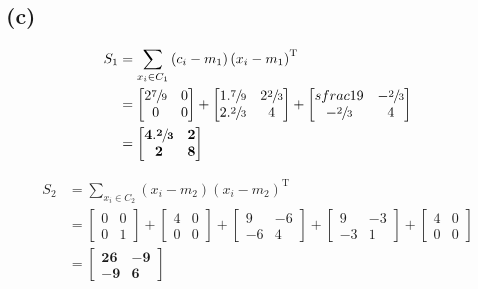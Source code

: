 \documentclass[12pt]{article}
\begin{document}
	\subsection*{(c)}
	\begingroup
	\addtolength{\jot}{1em}
	\begin{align*}
		S_1 &= \sum_{x_i \in C_1} \left(c_i-m_1\right)\left(x_i-m_1\right)^\textrm{T} \\
		&= \begin{bmatrix}
			2\sfrac{7}{9} & 0 \\
			0 & 0
		\end{bmatrix}
		+ \begin{bmatrix}
			1.\sfrac{7}{9} & 2\sfrac{2}{3} \\
			2.\sfrac{2}{3} & 4
		\end{bmatrix}
		+ \begin{bmatrix}
			sfrac{1}{9} & -\sfrac{2}{3} \\
			-\sfrac{2}{3} & 4
		\end{bmatrix} \\
		&= \begin{bmatrix}
			\mathbf{4.\sfrac{2}{3}} & \mathbf{2} \\
			\mathbf{2} & \mathbf{8}
		\end{bmatrix}
	\end{align*}
	\endgroup

	\begingroup
	\addtolength{\jot}{1em}
	\begin{align*}
		S_2 &= \sum_{x_i \in C_2}\left(x_i-m_2\right)\left(x_i-m_2\right)^\textrm{T} \\
		&= \begin{bmatrix}
			0 & 0 \\
			0 & 1
		\end{bmatrix}
		+ \begin{bmatrix}
			4 & 0 \\
			0 & 0
		\end{bmatrix}
		+ \begin{bmatrix}
			9 & -6 \\
			-6 & 4
		\end{bmatrix}
		+ \begin{bmatrix}
			9 & -3 \\
			-3 & 1
		\end{bmatrix}
		+ \begin{bmatrix}
			4 & 0 \\
			0 & 0
		\end{bmatrix} \\
		& = \begin{bmatrix}
			\mathbf{26} & \mathbf{-9} \\
			\mathbf{-9} & \mathbf{6}
		\end{bmatrix}
	\end{align*}
	\endgroup
\end{document}
